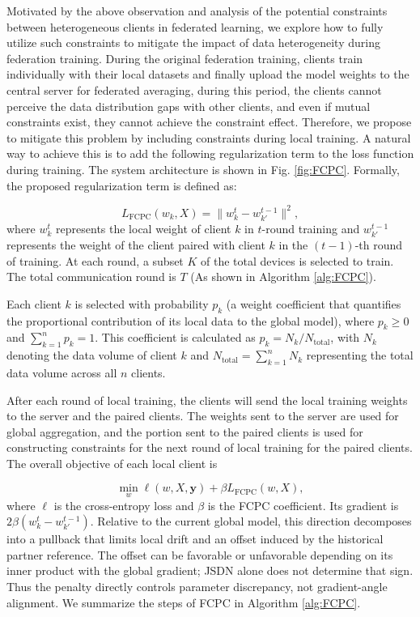 \documentclass[journal,twoside,web]{ieeecolor}
\begin{document}
Motivated by the above observation and analysis of the potential constraints between heterogeneous clients in federated learning, we explore how to fully utilize such constraints to mitigate the impact of data heterogeneity during federation training.
During the original federation training, clients train individually with their local datasets and finally upload the model weights to the central server for federated averaging, during this period, the clients cannot perceive the data distribution gaps with other clients, and even if mutual constraints exist, they cannot achieve the constraint effect. Therefore, we propose to mitigate this problem by including constraints during local training. A natural way to achieve this is to add the following regularization term to the loss function during training. The system architecture is shown in Fig. \ref{fig:FCPC}. Formally, the proposed regularization term is defined as:

\begin{equation}
L_{\text{FCPC}}(w_k, X) = \|w_k^t- w_{k'}^{t-1}\|^2 ,
\end{equation}
where \( w_k^t \) represents the local weight of client $k$ in $t$-round training and \( w_{k'}^{t-1}\) represents the weight of the client paired with client $k$ in the $(t-1)$-th round of training.
At each round, a subset $K$ of the total devices is selected to train. The total communication round is $T$ (As shown in Algorithm \ref{alg:FCPC}).

Each client $k$ is selected with probability $p_k$ (a weight coefficient that quantifies the proportional contribution of its local data to the global model), where $p_k \geq 0$ and $\sum_{k=1}^n p_k = 1$. This coefficient is calculated as $p_k = N_k / N_{\text{total}}$, with $N_k$ denoting the data volume of client $k$ and $N_{\text{total}} = \sum_{k=1}^n N_k$ representing the total data volume across all $n$ clients.

After each round of local training, the clients will send the local training weights to the server and the paired clients. The weights sent to the server are used for global aggregation, and the portion sent to the paired clients is used for constructing constraints for the next round of local training for the paired clients. The overall objective of each local client is

\begin{equation}
\min_{w} \ell(w, X, \mathbf{y}) + \beta L_{\text{FCPC}}(w, X),
\label{equa:beta}
\end{equation}
where \(\ell\) is the cross-entropy loss and $\beta$ is the FCPC coefficient. Its gradient is $2\beta(w_k^t-w_{k'}^{t-1})$. Relative to the current global model, this direction decomposes into a pullback that limits local drift and an offset induced by the historical partner reference. The offset can be favorable or unfavorable depending on its inner product with the global gradient; JSDN alone does not determine that sign. Thus the penalty directly controls parameter discrepancy, not gradient-angle alignment. We summarize the steps of FCPC in Algorithm \ref{alg:FCPC}.
\end{document}
